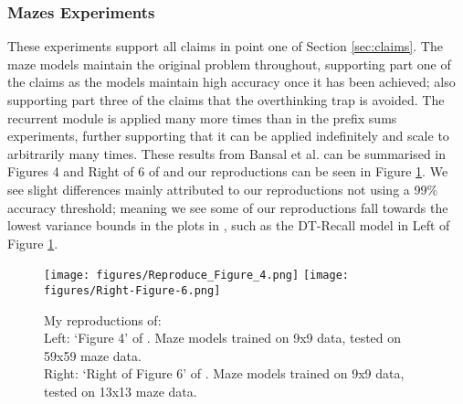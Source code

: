 \subsubsection{Mazes Experiments}
These experiments support all claims in point one of Section \ref{sec:claims}. The maze models maintain the original problem throughout, supporting part one of the claims as the models maintain high accuracy once it has been achieved; also supporting part three of the claims that the overthinking trap is avoided. The recurrent module is applied many more times than in the prefix sums experiments, further supporting that it can be applied indefinitely and scale to arbitrarily many times. These results from Bansal et al. can be summarised in Figures 4 and Right of 6 of \cite{bansal2022endtoend} and our reproductions can be seen in Figure \ref{figs:mazes}. We see slight differences mainly attributed to our reproductions not using a 99\% accuracy threshold; meaning we see some of our reproductions fall towards the lowest variance bounds in the plots in \cite{bansal2022endtoend}, such as the DT-Recall model in Left of Figure \ref{figs:mazes}. 

\begin{figure}[h]
    \texttt{[image: figures/Reproduce\_Figure\_4.png]}\hfill
    \texttt{[image: figures/Right-Figure-6.png]}
    \\[\smallskipamount]
    \caption{My reproductions of:\\
    Left: `Figure 4' of \cite{bansal2022endtoend}. Maze models trained on 9x9 data, tested on 59x59 maze data.\\
    Right: `Right of Figure 6' of \cite{bansal2022endtoend}. Maze models trained on 9x9 data, tested on 13x13 maze data.}
    \label{figs:mazes}
\end{figure}
